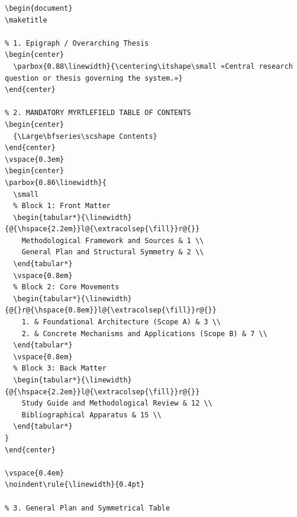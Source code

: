 \documentclass[11pt,letterpaper]{article}
\begin{document}
\begin{lstlisting}
\begin{document}
\maketitle

% 1. Epigraph / Overarching Thesis
\begin{center}
  \parbox{0.88\linewidth}{\centering\itshape\small «Central research question or thesis governing the system.»}
\end{center}

% 2. MANDATORY MYRTLEFIELD TABLE OF CONTENTS
\begin{center}
  {\Large\bfseries\scshape Contents}
\end{center}
\vspace{0.3em}
\begin{center}
\parbox{0.86\linewidth}{
  \small
  % Block 1: Front Matter
  \begin{tabular*}{\linewidth}{@{\hspace{2.2em}}l@{\extracolsep{\fill}}r@{}}
    Methodological Framework and Sources & 1 \\
    General Plan and Structural Symmetry & 2 \\
  \end{tabular*}
  \vspace{0.8em}
  % Block 2: Core Movements
  \begin{tabular*}{\linewidth}{@{}r@{\hspace{0.8em}}l@{\extracolsep{\fill}}r@{}}
    1. & Foundational Architecture (Scope A) & 3 \\
    2. & Concrete Mechanisms and Applications (Scope B) & 7 \\
  \end{tabular*}
  \vspace{0.8em}
  % Block 3: Back Matter
  \begin{tabular*}{\linewidth}{@{\hspace{2.2em}}l@{\extracolsep{\fill}}r@{}}
    Study Guide and Methodological Review & 12 \\
    Bibliographical Apparatus & 15 \\
  \end{tabular*}
}
\end{center}

\vspace{0.4em}
\noindent\rule{\linewidth}{0.4pt}

% 3. General Plan and Symmetrical Table

\end{lstlisting}
\end{document}
